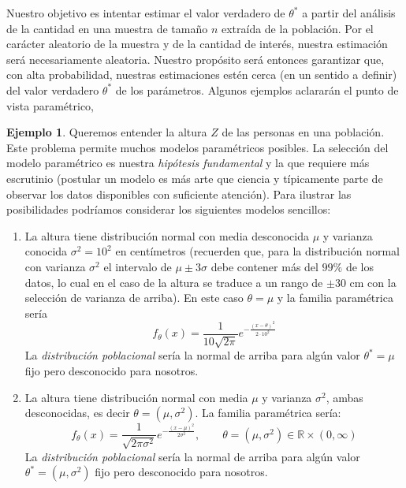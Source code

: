 \documentclass[12pt]{amsart}
\theoremstyle{definition}
\newtheorem{examplex}[lemma]{Ejemplo}
\newcommand{\RR}{\ensuremath{\mathbb{R}}}
\begin{document}
Nuestro objetivo es intentar estimar el valor verdadero de $\theta^*$ a partir del análisis de la cantidad en una muestra de tamaño $n$ extraída de la población. Por el carácter aleatorio de la muestra y de la cantidad de interés, nuestra estimación será necesariamente aleatoria. Nuestro propósito será entonces garantizar que, con alta probabilidad, nuestras estimaciones estén cerca (en un sentido a definir) del valor verdadero $\theta^*$ de los parámetros. Algunos ejemplos aclararán el punto de vista paramétrico,

\begin{examplex} \label{ex: altura}
    Queremos entender la altura $Z$ de las personas en una población. Este problema permite muchos modelos paramétricos posibles. La selección del modelo paramétrico es nuestra \emph{hipótesis fundamental} y la que requiere más escrutinio (postular un modelo es más arte que ciencia y típicamente parte de observar los datos disponibles con suficiente atención). Para ilustrar las posibilidades podríamos considerar los siguientes modelos sencillos:
    \begin{enumerate}
        \item La altura tiene distribución normal con media desconocida $\mu$ y varianza conocida $\sigma^2=10^2$ en centímetros (recuerden que, para la distribución normal con varianza $\sigma^2$ el intervalo de $\mu \pm 3\sigma$ debe contener más del $99\%$ de los datos, lo cual en el caso de la altura se traduce a un rango de $\pm 30$ cm con la selección de varianza de arriba). En este caso $\theta=\mu$ y la familia paramétrica sería 
        \[f_{\theta}(x)=\frac{1}{10\sqrt{2\pi}} e^{-\frac{(x-\theta)^2}{2\cdot 10^2}}\]
        La \emph{distribución poblacional} sería la normal de arriba para algún valor $\theta^*=\mu$ fijo pero desconocido para nosotros.

        \item La altura tiene distribución normal con media $\mu$ y varianza $\sigma^2$, ambas desconocidas, es decir $\theta=(\mu,\sigma^2)$.
        La familia paramétrica sería:
        \[f_{\theta}(x)=\frac{1}{\sqrt{2\pi\sigma^2}} e^{-\frac{(x-\mu)^2}{2\sigma^2}},\qquad \theta=(\mu,\sigma^2)\in\RR\times(0,\infty)\]
        La \emph{distribución poblacional} sería la normal de arriba para algún valor $\theta^*=(\mu,\sigma^2)$ fijo pero desconocido para nosotros.
        

\end{enumerate}
\end{examplex}
\end{document}

